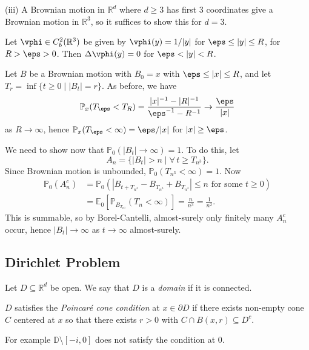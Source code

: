 \documentclass[12pt]{article}
\begin{document}
\begin{proofbox}
	(iii) A Brownian motion in $\mathbb{R}^d$ where $d \geq 3$ has first 3 coordinates give a Brownian motion in $\mathbb{R}^3$, so it suffices to show this for $d = 3$.

	Let $\vphi \in C_b^2(\mathbb{R}^3)$ be given by $\vphi(y) = 1/|y|$ for $\eps \leq |y| \leq R$, for $R > \eps > 0$. Then $\Delta \vphi(y) = 0$ for $\eps < |y| < R$.

	Let $B$ be a Brownian motion with $B_0 = x$ with $\eps \leq |x| \leq R$, and let $T_r = \inf\{t \geq 0 \mid |B_t| = r\}$. As before, we have
	\[
	\mathbb{P}_x(T_\eps < T_R) = \frac{|x|^{-1} - |R|^{-1}}{\eps^{-1} - R^{-1}} \to \frac{\eps}{|x|}
	\]
	as $R \to \infty$, hence $\mathbb{P}_x(T_\eps < \infty) = \eps/|x|$ for $|x| \geq \eps$.

	We need to show now that $\mathbb{P}_0(|B_t| \to \infty) = 1$. To do this, let
	\[
		A_n = \{|B_t| > n \mid \forall \, t \geq T_{n^3}\}.
	\]
	Since Brownian motion is unbounded, $\mathbb{P}_0(T_{n^3}< \infty) = 1$. Now
	\begin{align*}
		\mathbb{P}_0(A_n^{c}) &= \mathbb{P}_0(|B_{t + T_{n^3}} - B_{T_{n^3}} + B_{T_{n^3}}| \leq n \text{ for some } t \geq 0) \\
				      &= \mathbb{E}_0[ \mathbb{P}_{B_{T_{n^3}}}(T_n < \infty)] = \frac{n}{n^3} = \frac 1{n^2}.
	\end{align*}
	This is summable, so by Borel-Cantelli, almost-surely only finitely many $A_n^{c}$ occur, hence $|B_t| \to \infty$ as $t \to \infty$ almost-surely.
\end{proofbox}

\subsection{Dirichlet Problem}%
\label{sub:dps}

\begin{definition}
	Let $D \subseteq \mathbb{R}^d$ be open. We say that $D$ is a \emph{domain} if it is connected.

	$D$ satisfies the \emph{Poincar\'e cone condition} at $x \in \partial D$ if there exists non-empty cone $C$ centered at $x$ so that there exists $r > 0$ with $C \cap B(x, r) \subseteq D^{c}$.
\end{definition}

For example $\mathbb{D} \setminus [-i, 0]$ does not satisfy the condition at $0$.
\end{document}
